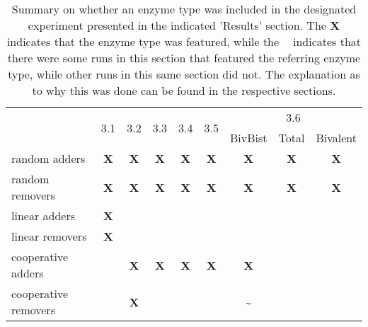             \begin{table}
                \centering
                \caption{Summary on whether an enzyme type was included in the designated experiment presented in the indicated 'Results' section. The \textbf{X} indicates that the enzyme type was featured, while the \textbf{~} indicates that there were some runs in this section that featured the referring enzyme type, while other runs in this same section did not. The explanation as to why this was done can be found in the respective sections.}
                \begin{tabular}{l|c|c|c|c|c|c|c|c|}
                                            & \multirow{2}{*}{3.1} & \multirow{2}{*}{3.2} & \multirow{2}{*}{3.3} & \multirow{2}{*}{3.4} & \multirow{2}{*}{3.5} & \multicolumn{3}{c|}{3.6}                        \\
                                            &                      &                      &                      &                      &                      & BivBist & Total      & Bivalent    \\\hline
                random adders               & \textbf{X}           & \textbf{X}           & \textbf{X}           & \textbf{X}           & \textbf{X}           & \textbf{X}          & \textbf{X} & \textbf{X}  \\\hline
                random removers             & \textbf{X}           & \textbf{X}           & \textbf{X}           & \textbf{X}           & \textbf{X}           & \textbf{X}          & \textbf{X} & \textbf{X}  \\\hline
                linear adders               & \textbf{X}           &                      &                      &                      &                      &                     &            &             \\\hline
                linear removers             & \textbf{X}           &                      &                      &                      &                      &                     &            &             \\\hline
                cooperative adders          &                      & \textbf{X}           & \textbf{X}           & \textbf{X}           & \textbf{X}           & \textbf{X}          &            &             \\\hline
                cooperative removers        &                      & \textbf{X}          &                       &                      &                      & \textbf{\~}         &            &             \\\hline

\end{tabular}
\end{table}
